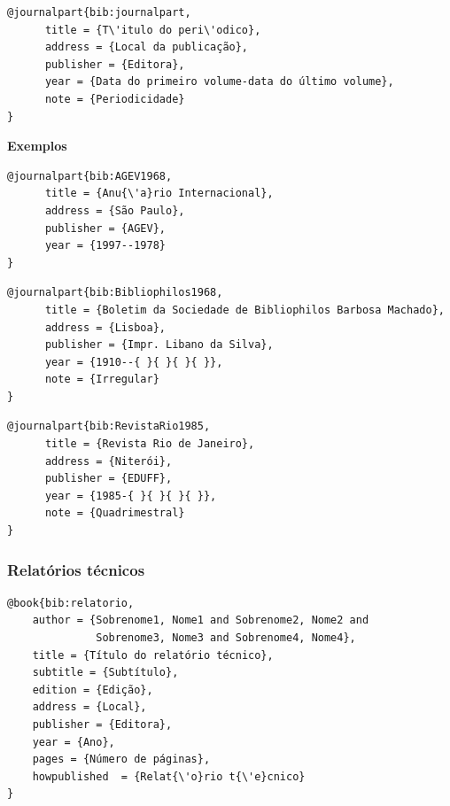 \documentclass[a4paper,12pt,oneside,onecolumn,final,fleqn]{repUERJ}
\begin{document}
\noindent{}

\begin{verbatim}
@journalpart{bib:journalpart,
      title = {T\'itulo do peri\'odico},
      address = {Local da publicação},
      publisher = {Editora},
      year = {Data do primeiro volume-data do último volume},
      note = {Periodicidade}
}
\end{verbatim}

\noindent\textbf{Exemplos}\\

\noindent{}

\begin{verbatim}
@journalpart{bib:AGEV1968,
      title = {Anu{\'a}rio Internacional},
      address = {São Paulo},
      publisher = {AGEV},
      year = {1997--1978}
}
\end{verbatim}

\noindent{}

\begin{verbatim}
@journalpart{bib:Bibliophilos1968,
      title = {Boletim da Sociedade de Bibliophilos Barbosa Machado},
      address = {Lisboa},
      publisher = {Impr. Libano da Silva},
      year = {1910--{ }{ }{ }{ }},
      note = {Irregular}
}
\end{verbatim}

\noindent{}

\begin{verbatim}
@journalpart{bib:RevistaRio1985,
      title = {Revista Rio de Janeiro},
      address = {Niterói},
      publisher = {EDUFF},
      year = {1985-{ }{ }{ }{ }},
      note = {Quadrimestral}
}
\end{verbatim}

\subsubsection{Relatórios técnicos}

\noindent{}

\begin{verbatim}
@book{bib:relatorio,
    author = {Sobrenome1, Nome1 and Sobrenome2, Nome2 and
              Sobrenome3, Nome3 and Sobrenome4, Nome4},
    title = {Título do relatório técnico},
    subtitle = {Subtítulo},
    edition = {Edição},
    address = {Local},
    publisher = {Editora},
    year = {Ano},
    pages = {Número de páginas},
    howpublished  = {Relat{\'o}rio t{\'e}cnico}
}
\end{verbatim}
\end{document}
